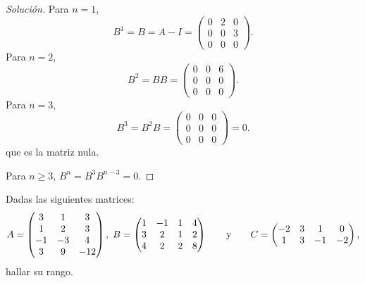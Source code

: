 \documentclass[a4,11pt]{aleph-notas}
\begin{document}
\begin{proof}[Solución]\hspace{0pt}
Para $n=1$,
    \[
        B^{1}=B=A-I= \begin{pmatrix}
            0 & 2 & 0 \\
            0 & 0 & 3 \\
            0 & 0 & 0
        \end{pmatrix}.
    \]
Para $n=2$, 
    \[
        B^{2}=B  B = \begin{pmatrix}
            0 & 0 & 6 \\
            0 & 0 & 0 \\
            0 & 0 & 0 
        \end{pmatrix}.
    \]
Para $n=3$, 
    \[
        B^{3}=B^{2} B= \begin{pmatrix}
            0 & 0 & 0 \\
            0 & 0 & 0 \\
            0 & 0 & 0
        \end{pmatrix} 
        = 0.
    \]
que es la matriz nula.

Para $n\geq 3$, $B^{n}=B^{3} B^{n-3}=0$.
\end{proof}

\begin{ejer}
    Dadas las siguientes matrices:
    \[
        A=
        \begin{pmatrix}
        3 & 1 & 3\\
        1 & 2 & 3\\
        -1 & -3 & 4\\
        3 & 9 & -12
        \end{pmatrix}
        , \hspace{0.1cm}
       B=
        \begin{pmatrix}
        1 & -1 & 1 & 4\\
        3 & 2 & 1 & 2\\
        4 & 2 & 2 & 8
        \end{pmatrix}
        \qquad\text{y}\qquad
        C=
        \begin{pmatrix}
        -2 & 3 & 1 &0\\
        1 & 3 & -1 & -2
        \end{pmatrix},
    \]
    hallar su rango.
\end{ejer}
\end{document}
